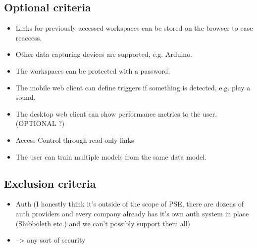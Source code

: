 \subsection{Optional criteria}
\begin{itemize}
    \item Links for previously accessed workspaces can be stored on the browser to ease reaccess.
    \item Other data capturing devices are supported, e.g. Arduino.
    \item The workspaces can be protected with a password.
    \item The mobile web client can define triggers if something is detected, e.g. play a sound.
    \item The desktop web client can show performance metrics to the user. (OPTIONAL ?)
    \item Access Control through read-only links
    \item The user can train multiple models from the same data model.
\end{itemize}

\subsection{Exclusion criteria}
\begin{itemize}
    \item Auth (I honestly think it's outside of the scope of PSE, there are dozens of auth providers and every company already has it's own auth system in place (Shibboleth etc.) and we can't possibly support them all)
    \item --> any sort of security
\end{itemize}
